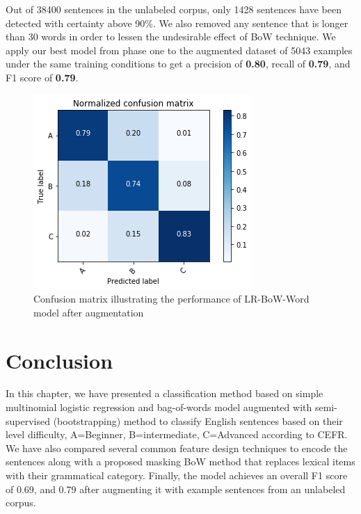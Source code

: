 Out of 38400 sentences in the unlabeled corpus, only 1428 sentences have been detected with certainty above 90\%. We also removed any sentence that is longer than 30 words in order to lessen the undesirable effect of BoW technique. We apply our best model from phase one to the augmented dataset of 5043 examples under the same training conditions to get a precision of \textbf{0.80}, recall of \textbf{0.79}, and F1 score of \textbf{0.79}. 

\begin{figure}[t]
    \centering
    \includegraphics[width=.75\linewidth]{../Figures/conf_matrix_iter2.png} 
    \caption{Confusion matrix illustrating the performance of LR-BoW-Word model after augmentation}
    \label{fig:cmdstudy}
\end{figure}

\section {Conclusion}
\label{sec:conclusion}
In this chapter, we have presented a classification method based on simple multinomial logistic regression and bag-of-words model augmented with semi-supervised (bootstrapping) method to classify English sentences based on their level difficulty, A=Beginner, B=intermediate, C=Advanced according to CEFR. We have also compared several common feature design techniques to encode the sentences along with a proposed masking BoW method that replaces lexical items with their grammatical category. Finally, the model achieves an overall F1 score of 0.69, and 0.79 after augmenting it with example sentences from an unlabeled corpus.

